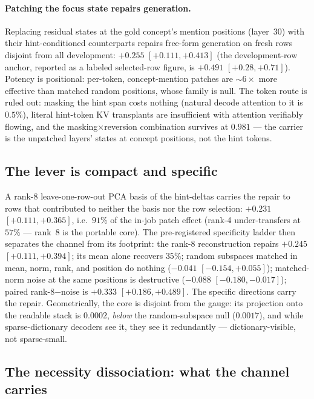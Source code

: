 \documentclass{article} %
\begin{document}
\paragraph{Patching the focus state repairs generation.} Replacing
residual states at the gold concept's mention positions (layer~30)
with their hint-conditioned counterparts repairs free-form generation
on fresh rows disjoint from all development: $+0.255$
$[+0.111,+0.413]$ (the development-row anchor, reported as a labeled
selected-row figure, is $+0.491$ $[+0.28,+0.71]$). Potency is
positional: per-token, concept-mention patches are ${\sim}6\times$
more effective than matched random positions, whose family is null.
The token route is ruled out: masking the hint span costs nothing
(natural decode attention to it is $0.5\%$), literal hint-token KV
transplants are insufficient with attention verifiably flowing, and
the masking$\times$reversion combination survives at $0.981$ --- the
carrier is the unpatched layers' states at concept positions, not the
hint tokens.

\subsection{The lever is compact and specific}\label{sec:specificity}

A rank-8 leave-one-row-out PCA basis of the hint-deltas carries the
repair to rows that contributed to neither the basis nor the row
selection: $+0.231$ $[+0.111,+0.365]$, i.e.\ $91\%$ of the in-job
patch effect (rank-4 under-transfers at $57\%$ --- rank~8 is the
portable core). The pre-registered specificity ladder then separates
the channel from its footprint: the rank-8 reconstruction repairs
$+0.245$ $[+0.111,+0.394]$; its mean alone recovers $35\%$; random
subspaces matched in mean, norm, rank, and position do nothing
($-0.041$ $[-0.154, +0.055]$); matched-norm noise at the same positions is destructive
($-0.088$ $[-0.180,-0.017]$); paired rank-8$-$noise is $+0.333$
$[+0.186,+0.489]$. The specific directions carry the repair.
Geometrically, the core is disjoint from the gauge: its projection
onto the readable stack is $0.0002$, \emph{below} the random-subspace
null ($0.0017$), and while sparse-dictionary decoders see it, they see
it redundantly --- dictionary-visible, not sparse-small.

\subsection{The necessity dissociation: what the channel
carries}\label{sec:fseries}
\end{document}
